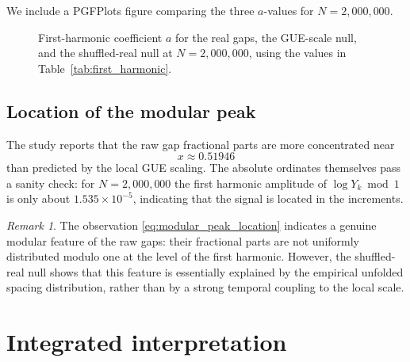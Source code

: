 \documentclass[11pt]{amsart}
\numberwithin{equation}{section}
\theoremstyle{plain}
\theoremstyle{definition}
\theoremstyle{remark}
\newtheorem{remark}[theorem]{Remark}
\begin{document}
We include a PGFPlots figure comparing the three $a$-values
for $N=2{,}000{,}000$.

\begin{figure}[htbp]
\centering
{}
\caption{First-harmonic coefficient $a$ for the real gaps,
the GUE-scale null, and the shuffled-real null at $N=2{,}000{,}000$,
using the values in Table~\ref{tab:first_harmonic}.}
\label{fig:first_harmonic_bar}
\end{figure}

\subsection{Location of the modular peak}
\label{subsec:modular_peak_location}

The study reports that the raw gap fractional parts are more
concentrated near
\begin{equation}
x \approx 0.51946
\label{eq:modular_peak_location}
\end{equation}
than predicted by the local GUE scaling.
The absolute ordinates themselves pass a sanity check:
for $N=2{,}000{,}000$ the first harmonic amplitude of
$\log Y_k \bmod 1$ is only about $1.535\times 10^{-5}$,
indicating that the signal is located in the increments.

\begin{remark}
\label{rem:modular_peak_interpretation}
The observation \eqref{eq:modular_peak_location}
indicates a genuine modular feature of the raw gaps:
their fractional parts are not uniformly distributed modulo one
at the level of the first harmonic.
However, the shuffled-real null shows that this feature is
essentially explained by the empirical unfolded spacing distribution,
rather than by a strong temporal coupling to the local scale.
\end{remark}

\section{Integrated interpretation}
\label{sec:integrated_interpretation}
\end{document}

